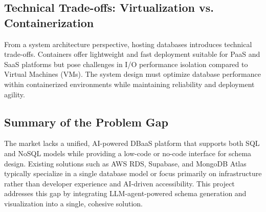 \subsection{Technical Trade-offs: Virtualization vs. Containerization}

From a system architecture perspective, hosting databases introduces technical trade-offs. Containers offer lightweight and fast deployment suitable for PaaS and SaaS platforms but pose challenges in I/O performance isolation compared to Virtual Machines (VMs). The system design must optimize database performance within containerized environments while maintaining reliability and deployment agility.

\subsection{Summary of the Problem Gap}

The market lacks a unified, AI-powered DBaaS platform that supports both SQL and NoSQL models while providing a low-code or no-code interface for schema design. Existing solutions such as AWS RDS, Supabase, and MongoDB Atlas typically specialize in a single database model or focus primarily on infrastructure rather than developer experience and AI-driven accessibility. This project addresses this gap by integrating LLM-agent-powered schema generation and visualization into a single, cohesive solution.

